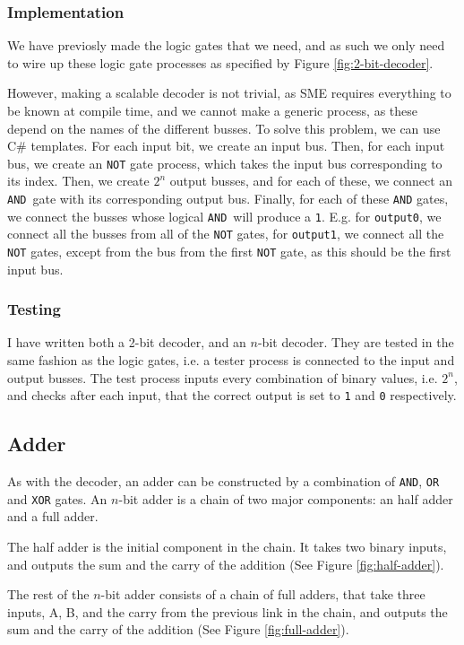 \subsubsection*{Implementation}
We have previosly made the logic gates that we need, and as such we only need
to wire up these logic gate processes as specified by Figure
\ref{fig:2-bit-decoder}.

However, making a scalable decoder is not trivial, as SME requires everything
to be known at compile time, and we cannot make a generic process, as these
depend on the names of the different busses. To solve this problem, we can use
C\# templates. For each input bit, we create an input bus. Then, for each input
bus, we create an \texttt{NOT} gate process, which takes the input bus
corresponding to its index. Then, we create $2^n$ output busses, and for each
of these, we connect an \texttt{AND} gate with its corresponding output bus.
Finally, for each of these \texttt{AND} gates, we connect the busses whose
logical \texttt{AND} will produce a \texttt{1}. E.g. for \texttt{output0}, we
connect all the busses from all of the \texttt{NOT} gates, for
\texttt{output1}, we connect all the \texttt{NOT} gates, except from the bus
from the first \texttt{NOT} gate, as this should be the first input bus.

\subsubsection*{Testing}
I have written both a 2-bit decoder, and an $n$-bit decoder. They are tested in
the same fashion as the logic gates, i.e. a tester process is connected to the
input and output busses. The test process inputs every combination of binary
values, i.e. $2^n$, and checks after each input, that the correct output is set
to \texttt{1} and \texttt{0} respectively.

\subsection{Adder}
As with the decoder, an adder can be constructed by a combination of
\texttt{AND}, \texttt{OR} and \texttt{XOR} gates. An $n$-bit adder is a chain
of two major components: an half adder and a full adder.

The half adder is the initial component in the chain. It takes two binary
inputs, and outputs the sum and the carry of the addition (See Figure
\ref{fig:half-adder}).

The rest of the $n$-bit adder consists of a chain of full adders, that take
three inputs, A, B, and the carry from the previous link in the chain, and
outputs the sum and the carry of the addition (See Figure
\ref{fig:full-adder}).

